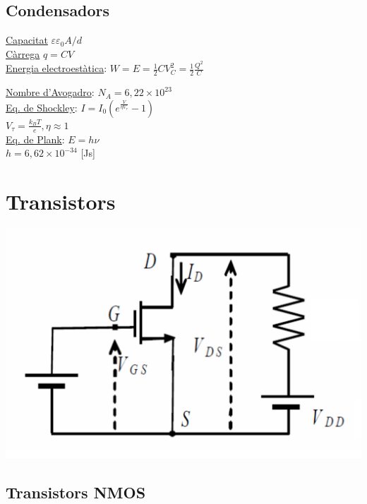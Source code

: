 \documentclass[12pt]{article}
\begin{document}
\raggedright
\begin{multicols}{4}

\subsection{Condensadors}

\underline{Capacitat} $\varepsilon \varepsilon_0 A / d$ \\
\underline{Càrrega} $q = CV$ \\
\underline{Energia electroestàtica}: $W = E = \frac{1}{2}CV_C^2 = \frac{1}{2}\frac{Q^2}{C}$






\underline{Nombre d'Avogadro}: $N_A = 6,22 \times 10^{23}$ \\
\underline{Eq. de Shockley}: $I = I_0 \left( e^{\frac{V}{\eta V_\tau}} -1 \right)$ \\
$V_\tau = \frac{k_BT}{e}, \eta \approx 1 $ \\
\underline{Eq. de Plank}: $E = h \nu$ \\
$h = 6,62 \times 10^{-34}$ [Js] \\

\section{Transistors}

\includegraphics[width=\linewidth]{Figures/Figura1.pdf}

\subsection{Transistors NMOS}


\end{multicols}
\end{document}
